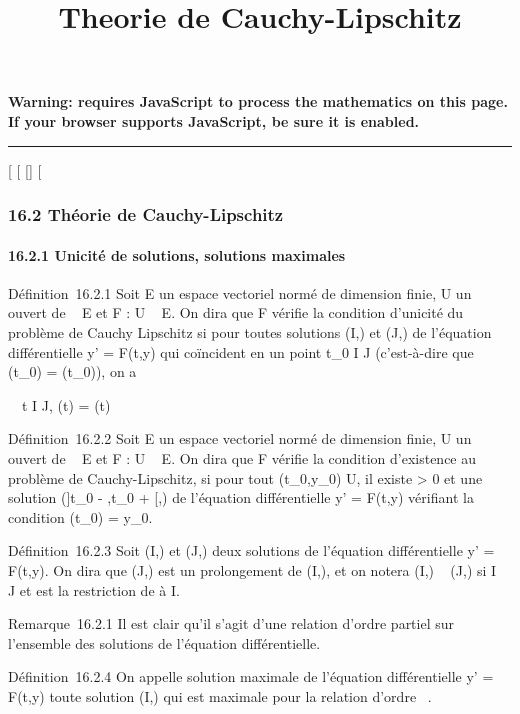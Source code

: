 \documentclass[]{article}
\title{Theorie de Cauchy-Lipschitz}
\author{}
\date{}
\begin{document}
\maketitle

\textbf{Warning: 
requires JavaScript to process the mathematics on this page.\\ If your
browser supports JavaScript, be sure it is enabled.}

\begin{center}\rule{3in}{0.4pt}\end{center}

[
[
[]
[

\subsubsection{16.2 Théorie de Cauchy-Lipschitz}

\paragraph{16.2.1 Unicité de solutions, solutions maximales}

Définition~16.2.1 Soit E un espace vectoriel normé de dimension finie, U
un ouvert de ~ \times E et F : U \rightarrow~ E. On dira que F vérifie la condition
d'unicité du problème de Cauchy Lipschitz si pour toutes solutions (I,\phi)
et (J,\psi) de l'équation différentielle y' = F(t,y) qui coïncident en un
point t_0 \in I \bigcap J (c'est-à-dire que \phi(t_0) =
\psi(t_0)), on a

\forall~~t \in I \bigcap J, \phi(t) = \psi(t)

Définition~16.2.2 Soit E un espace vectoriel normé de dimension finie, U
un ouvert de ~ \times E et F : U \rightarrow~ E. On dira que F vérifie la condition
d'existence au problème de Cauchy-Lipschitz, si pour tout
(t_0,y_0) \in U, il existe \eta > 0 et une
solution (]t_0 - \eta,t_0 + \eta[,\phi) de l'équation
différentielle y' = F(t,y) vérifiant la condition \phi(t_0) =
y_0.

Définition~16.2.3 Soit (I,\phi) et (J,\psi) deux solutions de l'équation
différentielle y' = F(t,y). On dira que (J,\psi) est un prolongement de
(I,\phi), et on notera (I,\phi) \prec~ (J,\psi) si I \subset~ J et \phi est la restriction de \psi
à I.

Remarque~16.2.1 Il est clair qu'il s'agit d'une relation d'ordre partiel
sur l'ensemble des solutions de l'équation différentielle.

Définition~16.2.4 On appelle solution maximale de l'équation
différentielle y' = F(t,y) toute solution (I,\phi) qui est maximale pour la
relation d'ordre \prec~.
\end{document}
